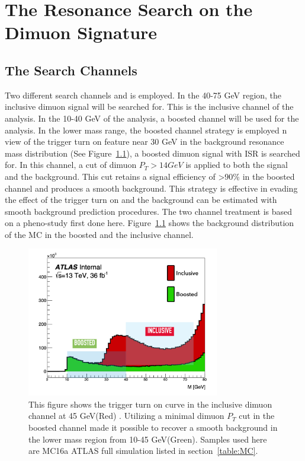 \chapter{The Resonance Search on the Dimuon Signature}
\label{chapter:dimuon}




\section{The Search Channels}
Two different search channels and is employed. In the 40-75 GeV region, the inclusive dimuon signal will be searched for. This is the inclusive channel of the analysis. In the 10-40 GeV of the analysis, a boosted channel will be used for the analysis. 
In the lower mass range, the boosted channel strategy is employed n view of the trigger turn on feature near 30 GeV in the background resonance mass distribution (See Figure~\ref{fig:turnon}), a boosted dimuon signal with ISR is searched for. In this channel, a cut of dimuon $P_{T}>14 GeV$ is applied to both the signal and the background. This cut retains a signal efficiency of >90\% in the boosted channel and produces a smooth background. This strategy is effective in evading the effect of the trigger turn on and the background can be estimated with smooth background prediction procedures. 
The two channel treatment is based on a pheno-study first done here\cite{2014}. Figure~\ref{fig:turnon} shows the background distribution of the MC in the boosted and the inclusive channel.

\begin{figure}[!htb]
    \begin{center}
        \includegraphics[width=0.75\textwidth]{figures/chapter_dimuon/turnon}
        \caption{
        This figure shows the trigger turn on curve in the inclusive dimuon channel at 45 GeV(Red) . Utilizing a minimal dimuon $P_{T}$ cut in the boosted channel made it possible to recover a smooth background in the lower mass region from 10-45 GeV(Green). Samples used here are MC16a ATLAS full simulation listed in section~\ref{table:MC}.
        }
        \label{fig:turnon}
    \end{center}
\end{figure}

